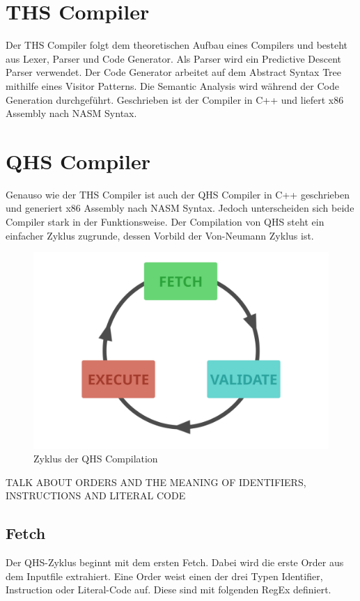 \chapter{THS Compiler}
Der THS Compiler folgt dem theoretischen Aufbau eines Compilers und besteht aus Lexer, Parser und Code Generator. Als Parser wird ein Predictive Descent Parser verwendet.
Der Code Generator arbeitet auf dem Abstract Syntax Tree mithilfe eines Visitor Patterns. Die Semantic Analysis wird während der Code Generation durchgeführt. Geschrieben ist der Compiler in C++ und liefert x86 Assembly nach NASM Syntax.

\chapter{QHS Compiler}
Genauso wie der THS Compiler ist auch der QHS Compiler in C++ geschrieben und generiert x86 Assembly nach NASM Syntax.
Jedoch unterscheiden sich beide Compiler stark in der Funktionsweise. Der Compilation von QHS steht ein einfacher Zyklus zugrunde, dessen Vorbild der Von-Neumann Zyklus ist.

\begin{figure}[h!]
    \centering
    \includegraphics[scale=0.6]{resources/qhs-cycle.png}
    \caption{Zyklus der QHS Compilation}
    \label{fig:qhs-cycle}
\end{figure}

TALK ABOUT ORDERS AND THE MEANING OF IDENTIFIERS, INSTRUCTIONS AND LITERAL CODE

\section{Fetch} \label{sec:qhs-fetch}
Der QHS-Zyklus beginnt mit dem ersten Fetch. Dabei wird die erste Order aus dem Inputfile extrahiert. Eine Order weist einen der drei Typen Identifier, Instruction oder Literal-Code auf. Diese sind mit folgenden RegEx definiert.

